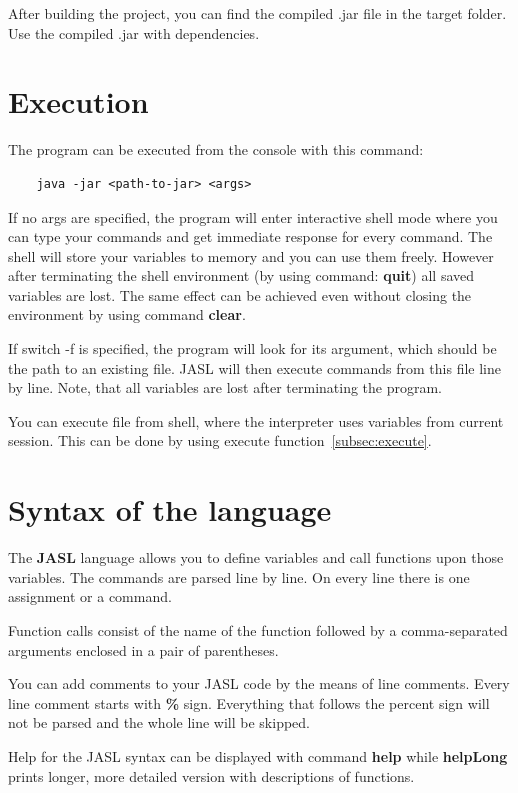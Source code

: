 \documentclass{ctuthesis}
\begin{document}
After building the project, you can find the compiled .jar file in the target folder. Use the compiled .jar with dependencies.

\section{Execution}
\label{sec:execution}
The program can be executed from the console with this command:

\begin{verbatim}
	java -jar <path-to-jar> <args>
\end{verbatim}

If no args are specified, the program will enter interactive shell mode where you can type your commands and get immediate response for every command. The shell will store your variables to memory and you can use them freely. However after terminating the shell environment (by using command: \textbf{quit}) all saved variables are lost. The same effect can be achieved even without closing the environment by using command \textbf{clear}. 

If switch -f is specified, the program will look for its argument, which should be the path to an existing file. JASL will then execute commands from this file line by line. Note, that all variables are lost after terminating the program. 

You can execute file from shell, where the interpreter uses variables from current session. This can be done by using execute function~\ref{subsec:execute}. 

\section{Syntax of the language}
\label{subsec:syntax}
The \textbf{JASL} language allows you to define variables and call functions upon those variables. The commands are parsed line by line. On every line there is one assignment or a command. 

Function calls consist of the name of the function followed by a comma-separated arguments enclosed in a pair of parentheses.

You can add comments to your JASL code by the means of line comments. Every line comment starts with \textbf{\%} sign. Everything that follows the percent sign will not be parsed and the whole line will be skipped. 

Help for the JASL syntax can be displayed with command \textbf{help} while \textbf{helpLong} prints longer, more detailed version with descriptions of functions. 
\end{document}
